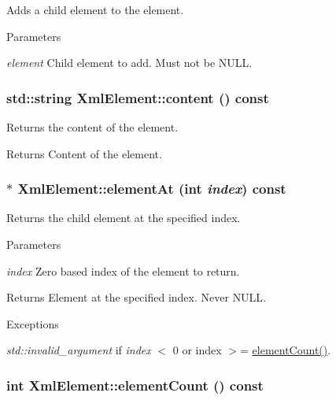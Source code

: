 Adds a child element to the element. 


\begin{DoxyParams}{Parameters}
\item[{\em element}]Child element to add. Must not be {\ttfamily NULL}. \end{DoxyParams}
\hypertarget{classXmlElement_a3fea4e46ca4e63ceb905a96a8f304381}{
\subsubsection[{content}]{\setlength{\rightskip}{0pt plus 5cm}std::string XmlElement::content () const}}
\label{classXmlElement_a3fea4e46ca4e63ceb905a96a8f304381}


Returns the content of the element. 

\begin{DoxyReturn}{Returns}
Content of the element. 
\end{DoxyReturn}
\hypertarget{classXmlElement_a083d56e5d6e8ef4f4ed462b3206b3af2}{
\subsubsection[{elementAt}]{ $\ast$ XmlElement::elementAt (int {\em index}) const}}
\label{classXmlElement_a083d56e5d6e8ef4f4ed462b3206b3af2}


Returns the child element at the specified index. 


\begin{DoxyParams}{Parameters}
\item[{\em index}]Zero based index of the element to return. \end{DoxyParams}
\begin{DoxyReturn}{Returns}
Element at the specified index. Never {\ttfamily NULL}. 
\end{DoxyReturn}

\begin{DoxyExceptions}{Exceptions}
\item[{\em std::invalid\_\-argument}]if {\itshape index\/} $<$ 0 or index $>$= \hyperlink{classXmlElement_a2aad0dda599cb46f85ff6b4b897045b9}{elementCount()}. \end{DoxyExceptions}
\hypertarget{classXmlElement_a2aad0dda599cb46f85ff6b4b897045b9}{
\subsubsection[{elementCount}]{\setlength{\rightskip}{0pt plus 5cm}int XmlElement::elementCount () const}}
\label{classXmlElement_a2aad0dda599cb46f85ff6b4b897045b9}


